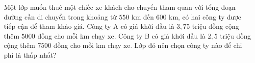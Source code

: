 \begin{bt}
{\begin{enumerate}[a)]
\begin{center}
\begin{tikzpicture}[scale=0.7, font=\footnotesize, line join=round, line cap=round,>=stealth]
				\end{tikzpicture}
			\end{center}
		\end{enumerate}
	}
\end{bt}

\begin{bt}%
	Một lớp muốn thuê một chiếc xe khách cho chuyến tham quan với tổng đoạn đường cần di chuyển trong khoảng từ $550$ km đến $600$ km, có hai công ty được tiếp cận để tham khảo giá. Công ty A có giá khởi đầu là $3{,}75$ triệu đồng cộng thêm $5000$ đồng cho mỗi km chạy xe. Công ty B có giá khởi đầu là $2{,}5$ triệu đồng cộng thêm $7500$ đồng cho mỗi km chạy xe. Lớp đó nên chọn công ty nào để chi phí là thấp nhất?

\end{bt}

